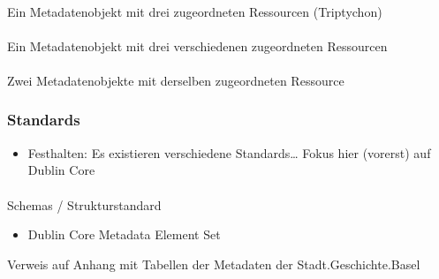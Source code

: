 \documentclass[
  letterpaper,
  DIV=11,
  numbers=noendperiod]{scrartcl}
\makeatletter
\let\oldparagraph\paragraph
\renewcommand{\paragraph}{
    \@ifstar
      \xxxParagraphStar
      \xxxParagraphNoStar
  }
\newcommand{\xxxParagraphStar}[1]{\oldparagraph*{#1}\mbox{}}
\newcommand{\xxxParagraphNoStar}[1]{\oldparagraph{#1}\mbox{}}
\providecommand{\tightlist}{%
  \setlength{\itemsep}{0pt}\setlength{\parskip}{0pt}}\usepackage{longtable,booktabs,array}
\makeatother
\begin{document}
\paragraph{Ein Metadatenobjekt mit drei zugeordneten Ressourcen
(Triptychon)}\label{ein-metadatenobjekt-mit-drei-zugeordneten-ressourcen-triptychon}

\paragraph{Ein Metadatenobjekt mit drei verschiedenen zugeordneten
Ressourcen}\label{ein-metadatenobjekt-mit-drei-verschiedenen-zugeordneten-ressourcen}

\paragraph{Zwei Metadatenobjekte mit derselben zugeordneten
Ressource}\label{zwei-metadatenobjekte-mit-derselben-zugeordneten-ressource}

\subsubsection{Standards}\label{standards}

\begin{itemize}
\tightlist
\item
  Festhalten: Es existieren verschiedene Standards\ldots{} Fokus hier
  (vorerst) auf Dublin Core
\end{itemize}

\paragraph{Schemas / Strukturstandard}\label{schemas-strukturstandard}

\begin{itemize}
\tightlist
\item
  Dublin Core Metadata Element Set
\end{itemize}

\begin{tcolorbox}[enhanced jigsaw, colbacktitle=quarto-callout-tip-color!10!white, rightrule=.15mm, coltitle=black, left=2mm, opacitybacktitle=0.6, toptitle=1mm, title=\textcolor{quarto-callout-tip-color}{\faLightbulb}\hspace{0.5em}{Tipp der Stadt.Geschichte.Basel}, colback=white, colframe=quarto-callout-tip-color-frame, opacityback=0, titlerule=0mm, leftrule=.75mm, breakable, bottomtitle=1mm, bottomrule=.15mm, arc=.35mm, toprule=.15mm]

Verweis auf Anhang mit Tabellen der Metadaten der Stadt.Geschichte.Basel

\end{tcolorbox}
\end{document}

